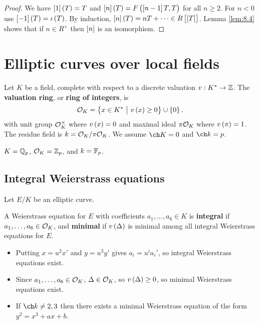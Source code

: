 \begin{proof}
We have $ \sbr{1}\br{T} = T $ and $ \sbr{n}\br{T} = F\br{\sbr{n - 1}T, T} $ for all $ n \ge 2 $. For $ n < 0 $ use $ \sbr{-1}\br{T} = \iota\br{T} $. By induction, $ \sbr{n}\br{T} = nT + \dots \in R\sbr{\sbr{T}} $. Lemma \ref{lem:8.4} shows that if $ n \in R^\times $ then $ \sbr{n} $ is an isomorphism.
\end{proof}

\pagebreak

\section{Elliptic curves over local fields}

Let $ K $ be a field, complete with respect to a discrete valuation $ v : K^* \to \mathbb{Z} $. The \textbf{valuation ring}, or \textbf{ring of integers}, is
$$ \OOO_K = \cbr{x \in K^* \st v\br{x} \ge 0} \cup \cbr{0}. $$
with unit group $ \mathcal{O}_K^\times $ where $ v\br{x} = 0 $ and maximal ideal $ \pi\mathcal{O}_K $ where $ v\br{\pi} = 1 $. The residue field is $ k = \mathcal{O}_K / \pi\mathcal{O}_K $. We assume $ \ch K = 0 $ and $ \ch k = p $.

\begin{example*}
$ K = \mathbb{Q}_p $, $ \mathcal{O}_K = \mathbb{Z}_p $, and $ k = \mathbb{F}_p $.
\end{example*}

\subsection{Integral Weierstrass equations}

Let $ E / K $ be an elliptic curve.

\begin{definition*}
A Weierstrass equation for $ E $ with coefficients $ a_1, \dots, a_6 \in K $ is \textbf{integral} if $ a_1, \dots, a_6 \in \mathcal{O}_K $, and \textbf{minimal} if $ v\br{\Delta} $ is minimal among all integral Weierstrass equations for $ E $.
\end{definition*}

\begin{remark*}
\hfill
\begin{itemize}
\item Putting $ x = u^2x' $ and $ y = u^3y' $ gives $ a_i = u^ia_i' $, so integral Weierstrass equations exist.
\item Since $ a_1, \dots, a_6 \in \mathcal{O}_K $, $ \Delta \in \mathcal{O}_K $, so $ v\br{\Delta} \ge 0 $, so minimal Weierstrass equations exist.
\item If $ \ch k \ne 2, 3 $ then there exists a minimal Weierstrass equation of the form $ y^2 = x^3 + ax + b $.
\end{itemize}
\end{remark*}


